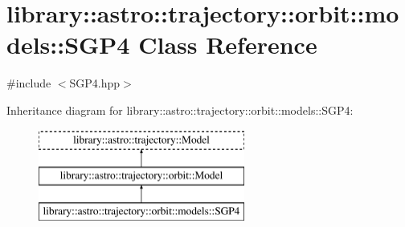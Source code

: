 \hypertarget{classlibrary_1_1astro_1_1trajectory_1_1orbit_1_1models_1_1_s_g_p4}{}\section{library\+:\+:astro\+:\+:trajectory\+:\+:orbit\+:\+:models\+:\+:S\+G\+P4 Class Reference}
\label{classlibrary_1_1astro_1_1trajectory_1_1orbit_1_1models_1_1_s_g_p4}


{\ttfamily \#include $<$S\+G\+P4.\+hpp$>$}

Inheritance diagram for library\+:\+:astro\+:\+:trajectory\+:\+:orbit\+:\+:models\+:\+:S\+G\+P4\+:\begin{figure}[H]
\begin{center}
\leavevmode
\includegraphics[height=3.000000cm]{classlibrary_1_1astro_1_1trajectory_1_1orbit_1_1models_1_1_s_g_p4}
\end{center}
\end{figure}
